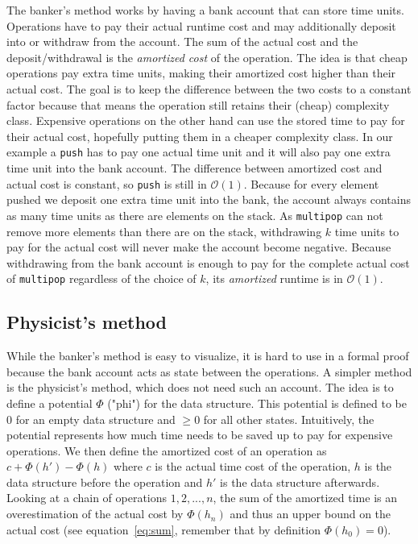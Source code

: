 \documentclass[sigplan,screen,review,anonymous]{acmart}
\renewcommand\O[1]{$\mathcal{O}(#1)$}
\begin{document}
The banker's method works by having a bank account that can store time units. Operations have to pay their actual runtime cost and may additionally deposit into or withdraw from the account. The sum of the actual cost and the deposit/withdrawal is the \textit{amortized cost} of the operation. The idea is that cheap operations pay extra time units, making their amortized cost higher than their actual cost. The goal is to keep the difference between the two costs to a constant factor because that means the operation still retains their (cheap) complexity class. Expensive operations on the other hand can use the stored time to pay for their actual cost, hopefully putting them in a cheaper complexity class. In our example a \texttt{push} has to pay one actual time unit and it will also pay one extra time unit into the bank account. The difference between amortized cost and actual cost is constant, so \texttt{push} is still in \O{1}. Because for every element pushed we deposit one extra time unit into the bank, the account always contains as many time units as there are elements on the stack. As \texttt{multipop} can not remove more elements than there are on the stack, withdrawing $k$ time units to pay for the actual cost will never make the account become negative. Because withdrawing from the bank account is enough to pay for the complete actual cost of \texttt{multipop} regardless of the choice of $k$, its \textit{amortized} runtime is in \O{1}.

\subsection{Physicist's method}\label{sec:physicist}

While the banker's method is easy to visualize, it is hard to use in a formal proof because the bank account acts as state between the operations. A simpler method is the physicist's method, which does not need such an account. The idea is to define a potential $\Phi$ ("phi") for the data structure. This potential is defined to be $0$ for an empty data structure and $\ge 0$ for all other states. Intuitively, the potential represents how much time needs to be saved up to pay for expensive operations. We then define the amortized cost of an operation as $c + \Phi(h') - \Phi(h)$ where $c$ is the actual time cost of the operation, $h$ is the data structure before the operation and $h'$ is the data structure afterwards. Looking at a chain of operations $1, 2, ..., n$, the sum of the amortized time is an overestimation of the actual cost by $\Phi(h_n)$ and thus an upper bound on the actual cost (see equation~\ref{eq:sum}, remember that by definition $\Phi(h_0) = 0$).
\end{document}

